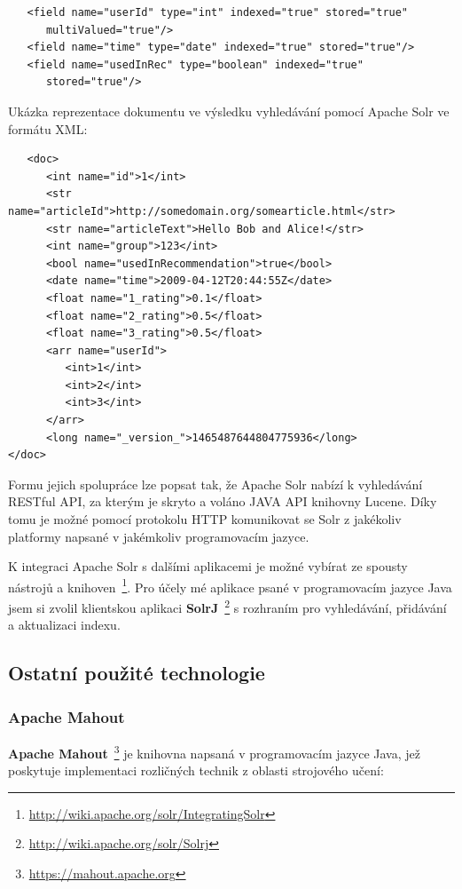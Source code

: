 \documentclass[thesis=M,czech]{FITthesis}[2014/05/07]
\begin{document}
\begin{verbatim}
   <field name="userId" type="int" indexed="true" stored="true"
      multiValued="true"/>	
   <field name="time" type="date" indexed="true" stored="true"/>
   <field name="usedInRec" type="boolean" indexed="true"
      stored="true"/>
\end{verbatim}

Ukázka reprezentace dokumentu ve výsledku vyhledávání pomocí Apache Solr ve formátu XML:

\begin{verbatim}
   <doc>
      <int name="id">1</int>
      <str name="articleId">http://somedomain.org/somearticle.html</str>
      <str name="articleText">Hello Bob and Alice!</str>
      <int name="group">123</int>
      <bool name="usedInRecommendation">true</bool>
      <date name="time">2009-04-12T20:44:55Z</date>
      <float name="1_rating">0.1</float>
      <float name="2_rating">0.5</float>
      <float name="3_rating">0.5</float>      
      <arr name="userId">
         <int>1</int>
         <int>2</int>
         <int>3</int>
      </arr>
      <long name="_version_">1465487644804775936</long>      
</doc>
\end{verbatim}

Formu jejich spolupráce lze popsat tak, že Apache Solr nabízí k vyhledávání RESTful API, za kterým je skryto a voláno JAVA API knihovny Lucene. Díky tomu je možné pomocí protokolu HTTP komunikovat se Solr z jakékoliv platformy napsané v jakémkoliv programovacím jazyce. 

K integraci Apache Solr s dalšími aplikacemi je možné vybírat ze spousty nástrojů a knihoven~\footnote{\url{http://wiki.apache.org/solr/IntegratingSolr}}. Pro účely mé aplikace psané v programovacím jazyce Java jsem si zvolil klientskou aplikaci \textbf{SolrJ}~\footnote{\url{http://wiki.apache.org/solr/Solrj}} s rozhraním pro vyhledávání, přidávání a aktualizaci indexu. 

\subsection{Ostatní použité technologie}

\subsubsection{Apache Mahout}
\textbf{Apache Mahout}~\footnote{\url{https://mahout.apache.org}} je knihovna napsaná v programovacím jazyce Java, jež poskytuje implementaci rozličných technik z oblasti strojového učení:
\end{document}

